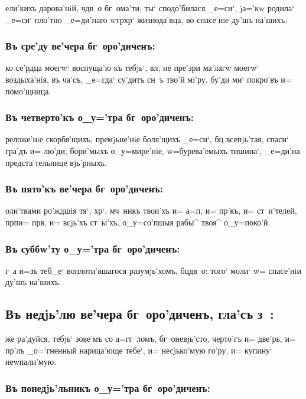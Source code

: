 \documentclass[14pt,twoside]{extreport}
\renewcommand{\*}{~~\raise3pt\hbox{\footnotesize*}}
\begin{document}
ели'кихъ дарова'нiй, ч дв~о бг~ома'ти, ты` сподо'билася _е=си`,
jа='кw родила` _е=си` пло'тiю _е=ди'наго w\т тр хр` жизнода'вца, во
спасе'нiе ду'шъ на'шихъ.

\subsubsection{Въ сре'ду ве'чера бг~оро'диченъ:}

ко се'рдца моегw` воспуща'ю къ тебjь`, вл, не пре'зри ма'лагw
моегw` воздыха'нiя, въ ча'съ, _е=гда` су'дитъ сн~ъ тво'й мi'ру, бу'ди ми`
покро'въ и= помо'щница.

\subsubsection{Въ четверто'къ о_у='тра бг~оро'диченъ:}

реложе'нiе скорбя'щихъ, премjьне'нiе боля'щихъ _е=си`, бц
всепjь'тая, спаси` гра'дъ и= лю'ди, бори'мыхъ о_у=мире'нiе, w=бурева'емыхъ
тишина`, _е=ди'на предста'тельнице вjь'рныхъ.

\subsubsection{Въ пято'къ ве'чера бг~оро'диченъ:}

оли'твами ро'ждшiя тя`, хр`, мч~никъ тво\-и'хъ и= а=п, и=
пр'къ, и= ст~и'телей, прп и= прв, и= всjь'хъ ст~ы'хъ,
о_у=со'пшыя рабы^ твоя^ о_у=поко'й.

\subsubsection{Въ суббw'ту о_у='тра бг~оро'диченъ:}

г~а и=зъ теб_е` воплоти'вшагося разумjь'хомъ, бц дв~о: того` моли`
w= спасе'нiи ду'шъ на'шихъ.

\delimpict

\subsection[Гла'съ з~]{Въ недjь'лю ве'чера бг~оро'диченъ, гла'съ з~:}

же ра'дуйся, тебjь` зове'мъ со а=гг~ломъ, бг~о\-не\-вjь'\-сто, черто'гъ и=
две'рь, и= пр'лъ _о='гненный нарица'юще тебе`, и= несjько'мую го'ру, и=
купину` неwпали'мую.

\subsubsection{Въ понедjь'льникъ о_у='тра бг~оро'диченъ:}
\end{document}
